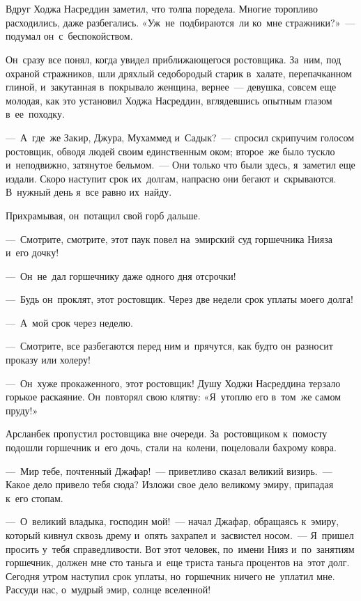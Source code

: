 \documentclass[12pt,a4paper]{book}
\begin{document}
\chapter{}

Вдруг Ходжа Насреддин заметил, что толпа поредела. Многие торопливо расходились, даже разбегались. «Уж~не~подбираются~ли ко~мне стражники?»~— подумал он~с~беспокойством.

Он~сразу все понял, когда увидел приближающегося ростовщика. За~ним, под охраной стражников, шли дряхлый седобородый старик в~халате, перепачканном глиной, и~закутанная в~покрывало женщина, вернее~— девушка, совсем еще молодая, как это установил Ходжа Насреддин, вглядевшись опытным глазом в~ее~походку.

—~А~где~же Закир, Джура, Мухаммед и~Садык?~— спросил скрипучим голосом ростовщик, обводя людей своим единственным оком; второе~же было тускло и~неподвижно, затянутое бельмом.~— Они только что были здесь, я~заметил еще издали. Скоро наступит срок их~долгам, напрасно они бегают и~скрываются. В~нужный день я~все равно их~найду.

Прихрамывая, он~потащил свой горб дальше.

—~Смотрите, смотрите, этот паук повел на~эмирский суд горшечника Нияза и~его дочку!

—~Он~не~дал горшечнику даже одного дня отсрочки!

—~Будь он~проклят, этот ростовщик. Через две недели срок уплаты моего долга!

—~А~мой срок через неделю.

—~Смотрите, все разбегаются перед ним и~прячутся, как будто он~разносит проказу или холеру!

—~Он~хуже прокаженного, этот ростовщик! Душу Ходжи Насреддина терзало горькое раскаяние. Он~повторял свою клятву: «Я~утоплю его в~том~же самом пруду!»

Арсланбек пропустил ростовщика вне очереди. За~ростовщиком к~помосту подошли горшечник и~его дочь, стали на~колени, поцеловали бахрому ковра.

—~Мир тебе, почтенный Джафар!~— приветливо сказал великий визирь.~— Какое дело привело тебя сюда? Изложи свое дело великому эмиру, припадая к~его стопам.

—~О~великий владыка, господин мой!~— начал Джафар, обращаясь к~эмиру, который кивнул сквозь дрему и~опять захрапел и~засвистел носом.~— Я~пришел просить у~тебя справедливости. Вот этот человек, по~имени Нияз и~по~занятиям горшечник, должен мне сто таньга и~еще триста таньга процентов на~этот долг. Сегодня утром наступил срок уплаты, но~горшечник ничего не~уплатил мне. Рассуди нас, о~мудрый эмир, солнце вселенной!
\end{document}
